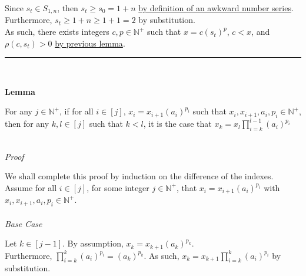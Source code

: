 \documentclass[a4paper,12pt]{article}
\begin{document}
\noindent Since $s_t \in S_{1, n}$, then $s_t \geq s_0 = 1 + n$ \hyperlink{definition:awkward_number_series}{by definition of an awkward number series}.\\

\noindent Furthermore, $s_t \geq 1 + n \geq 1 + 1 = 2$ by substitution.\\

\noindent As such, there exists integers $c, p \in \mathbb{N}^+$ such that $x = c(s_t)^p$, $c < x$, and $\rho(c, s_t) > 0$ \hyperlink{lemma:remainder_powers}{by previous lemma}.

\begin{center}
\noindent\rule{8cm}{0.4pt}
\end{center}
\noindent \\









\label{lemma:closed_form_of_factorization}
\hypertarget{lemma:closed_form_of_factorization}{}
\begin{tcolorbox}
\textbf{Lemma}

For any $j \in \mathbb{N}^+$, if for all $i \in [j]$, $x_i = x_{i + 1}(a_i)^{p_i}$ such that $x_i, x_{i + 1}, a_i, p_i \in \mathbb{N}^+$, then for any $k, l \in [j]$ such that $k < l$, it is the case that $\displaystyle x_k = x_l \prod_{i = k}^{l - 1} (a_i)^{p_i}$
\end{tcolorbox}

\noindent\\
\textit{Proof}

\noindent We shall complete this proof by induction on the difference of the indexes.\\

\noindent Assume for all $i \in [j]$, for some integer $j \in \mathbb{N}^+$, that $x_i = x_{i + 1}(a_i)^{p_i}$ with $x_i, x_{i + 1}, a_i, p_i \in \mathbb{N}^+$.\\

\noindent\\
\textit{Base Case}

\noindent Let $k \in [j - 1]$. By assumption, $x_k = x_{k + 1}(a_k)^{p_k}$.\\

\noindent Furthermore, $\displaystyle \prod_{i = k}^{k}(a_i)^{p_i} = (a_k)^{p_k}$. As such, $\displaystyle x_k = x_{k + 1} \prod_{i = k}^{k}(a_i)^{p_i}$ by substitution.\\
\end{document}
